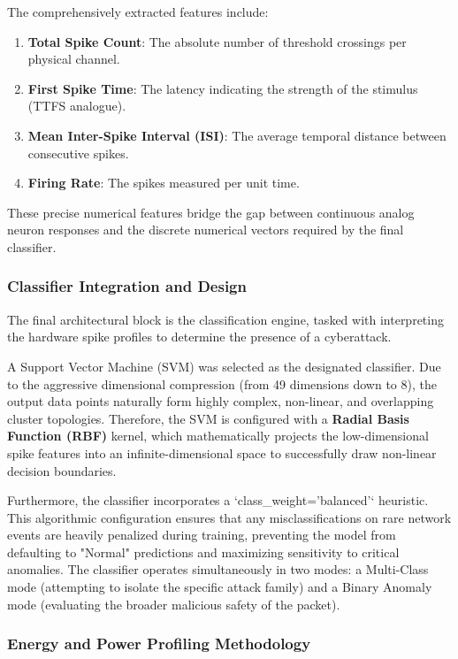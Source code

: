 \documentclass{ieeeaccess}
\begin{document}
The comprehensively extracted features include:
\begin{enumerate}
\item \textbf{Total Spike Count}: The absolute number of threshold crossings per physical channel.
\item \textbf{First Spike Time}: The latency indicating the strength of the stimulus (TTFS analogue).
\item \textbf{Mean Inter-Spike Interval (ISI)}: The average temporal distance between consecutive spikes.
\item \textbf{Firing Rate}: The spikes measured per unit time.
\end{enumerate}

These precise numerical features bridge the gap between continuous analog neuron responses and the discrete numerical vectors required by the final classifier.

\subsubsection{Classifier Integration and Design}

The final architectural block is the classification engine, tasked with interpreting the hardware spike profiles to determine the presence of a cyberattack. 

A Support Vector Machine (SVM) was selected as the designated classifier. Due to the aggressive dimensional compression (from 49 dimensions down to 8), the output data points naturally form highly complex, non-linear, and overlapping cluster topologies. Therefore, the SVM is configured with a \textbf{Radial Basis Function (RBF)} kernel, which mathematically projects the low-dimensional spike features into an infinite-dimensional space to successfully draw non-linear decision boundaries.

Furthermore, the classifier incorporates a `class\_weight='balanced'` heuristic. This algorithmic configuration ensures that any misclassifications on rare network events are heavily penalized during training, preventing the model from defaulting to "Normal" predictions and maximizing sensitivity to critical anomalies. The classifier operates simultaneously in two modes: a Multi-Class mode (attempting to isolate the specific attack family) and a Binary Anomaly mode (evaluating the broader malicious safety of the packet).

\subsubsection{Energy and Power Profiling Methodology}
\end{document}
